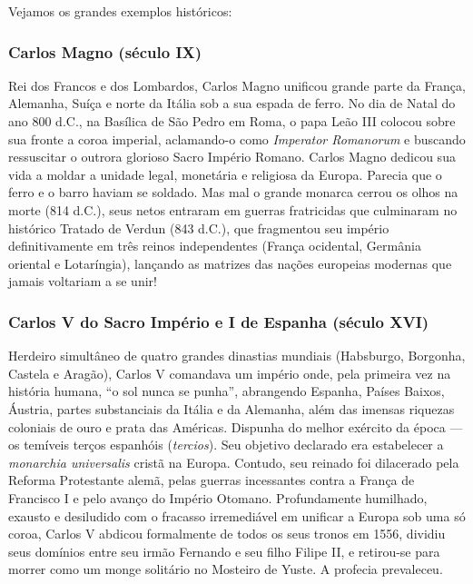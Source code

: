 Vejamos os grandes exemplos históricos:

\subsubsection*{Carlos Magno (século IX)}
Rei dos Francos e dos Lombardos, Carlos Magno unificou grande parte da França, Alemanha, Suíça e norte da Itália sob a sua espada de ferro. No dia de Natal do ano 800 d.C., na Basílica de São Pedro em Roma, o papa Leão III colocou sobre sua fronte a coroa imperial, aclamando-o como \textit{Imperator Romanorum} e buscando ressuscitar o outrora glorioso Sacro Império Romano. Carlos Magno dedicou sua vida a moldar a unidade legal, monetária e religiosa da Europa. Parecia que o ferro e o barro haviam se soldado. Mas mal o grande monarca cerrou os olhos na morte (814 d.C.), seus netos entraram em guerras fratricidas que culminaram no histórico Tratado de Verdun (843 d.C.), que fragmentou seu império definitivamente em três reinos independentes (França ocidental, Germânia oriental e Lotaríngia), lançando as matrizes das nações europeias modernas que jamais voltariam a se unir!


\subsubsection*{Carlos V do Sacro Império e I de Espanha (século XVI)}
Herdeiro simultâneo de quatro grandes dinastias mundiais (Habsburgo, Borgonha, Castela e Aragão), Carlos V comandava um império onde, pela primeira vez na história humana, ``o sol nunca se punha'', abrangendo Espanha, Países Baixos, Áustria, partes substanciais da Itália e da Alemanha, além das imensas riquezas coloniais de ouro e prata das Américas. Dispunha do melhor exército da época — os temíveis terços espanhóis (\textit{tercios}). Seu objetivo declarado era estabelecer a \textit{monarchia universalis} cristã na Europa. Contudo, seu reinado foi dilacerado pela Reforma Protestante alemã, pelas guerras incessantes contra a França de Francisco I e pelo avanço do Império Otomano. Profundamente humilhado, exausto e desiludido com o fracasso irremediável em unificar a Europa sob uma só coroa, Carlos V abdicou formalmente de todos os seus tronos em 1556, dividiu seus domínios entre seu irmão Fernando e seu filho Filipe II, e retirou-se para morrer como um monge solitário no Mosteiro de Yuste. A profecia prevaleceu.


